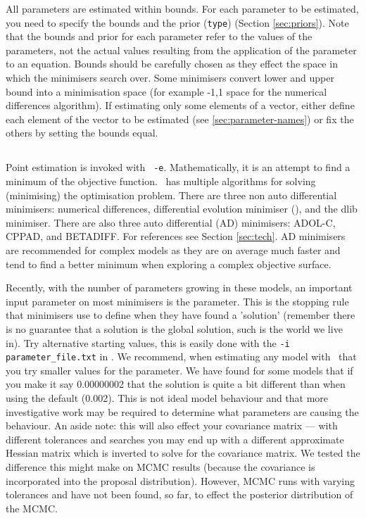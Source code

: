 All parameters are estimated within bounds. For each parameter to be estimated, you need to specify the bounds and the prior (\texttt{type}) (Section \ref{sec:priors}). Note that the bounds and prior for each parameter refer to the values of the parameters, not the actual values resulting from the application of the parameter to an equation. Bounds should be carefully chosen as they effect the space in which the minimisers search over. Some minimisers convert lower and upper bound into a minimisation space (for example -1,1 space for the numerical differences algorithm). If estimating only some elements of a vector, either define each element of the vector to be estimated (see \ref{sec:parameter-names}) or fix the others by setting the bounds equal.

\subsection{\label{sec:estimate-MPD}}
Point estimation is invoked with \texttt{\cname\ -e}. Mathematically, it is an attempt to find a minimum of the objective function. \CNAME\ has multiple algorithms for solving (minimising) the optimisation problem. There are three non auto differential minimisers: numerical differences, differential evolution minimiser (), and the dlib minimiser. There are also three auto differential (AD) minimisers: ADOL-C, CPPAD, and BETADIFF. For references see Section \ref{sec:tech}. AD minimisers are recommended for complex models as they are on average much faster and tend to find a better minimum when exploring a complex objective surface.

Recently, with the number of parameters growing in these models, an important input parameter on most minimisers is the  parameter. This is the stopping rule that minimisers use to define when they have found a 'solution' (remember there is no guarantee that a solution is the global solution, such is the world we live in). Try  alternative starting values, this is easily done with the \texttt{-i parameter\_file.txt} in \CNAME. We recommend, when estimating any model with \CNAME\, that you try smaller values for the  parameter. We have found for some models that if you make it say 0.00000002 that the solution is quite a bit different than when using the default (0.002). This is not ideal model behaviour and that more investigative work may be required to determine what parameters are causing the behaviour. An aside note: this will also effect your covariance matrix --- with different tolerances and searches you may end up with a different approximate Hessian matrix which is inverted to solve for the covariance matrix. We tested the difference this might make on MCMC results (because the covariance is incorporated into the proposal distribution). However,  MCMC runs with varying tolerances and have not been found, so far, to effect the posterior distribution of the MCMC.
